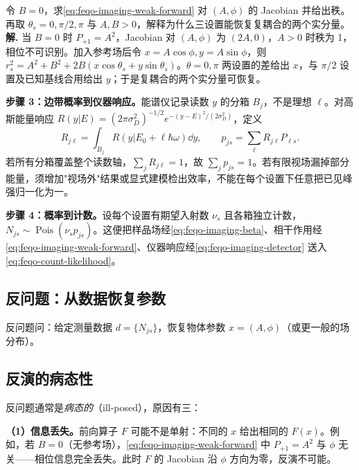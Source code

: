\par
\begin{workedexample}
令 \(B=0\)，求\cref{eq:feqo-imaging-weak-forward} 对 \((A,\phi)\) 的 Jacobian 并给出秩。再取 \(\theta_s=0,\pi/2,\pi\) 与 \(A,B>0\)，解释为什么三设置能恢复复耦合的两个实分量。
\textbf{解.} 当 \(B=0\) 时 \(P_{+1}=A^2\)，Jacobian 对 \((A,\phi)\) 为 \((2A,0)\)，\(A>0\) 时秩为 1，相位不可识别。加入参考场后令 \(x=A\cos\phi,y=A\sin\phi\)，则 \(r_s^2=A^2+B^2+2B(x\cos\theta_s+y\sin\theta_s)\)。\(\theta=0,\pi\) 两设置的差给出 \(x\)，与 \(\pi/2\) 设置及已知基线合用给出 \(y\)；于是复耦合的两个实分量可恢复。
\end{workedexample}
\par
\textbf{步骤 3：边带概率到仪器响应。}能谱仪记录读数 \(y\) 的分箱 \(B_j\)，不是理想 \(\ell\)。对高斯能量响应 \(R(y|E)=(2\pi\sigma_D^2)^{-1/2}e^{-(y-E)^2/(2\sigma_D^2)}\)，定义
\begin{equation}
R_{j\ell}=\int_{B_j}R(y|E_0+\ell\hbar\omega)\dd y,
\qquad p_{js}=\sum_\ell R_{j\ell}P_{\ell s}.
\label{eq:feqo-imaging-detector}
\end{equation}
若所有分箱覆盖整个读数轴，\(\sum_jR_{j\ell}=1\)，故 \(\sum_jp_{js}=1\)。若有限视场漏掉部分能量，须增加"视场外"结果或显式建模检出效率，不能在每个设置下任意把已见峰强归一化为一。

\textbf{步骤 4：概率到计数。}设每个设置有期望入射数 \(\nu_s\) 且各箱独立计数，\(N_{js}\sim\operatorname{Pois}(\nu_sp_{js})\)。这便把样品场经\cref{eq:feqo-imaging-beta}、相干作用经\cref{eq:feqo-imaging-weak-forward}、仪器响应经\cref{eq:feqo-imaging-detector} 送入\cref{eq:feqo-count-likelihood}。

\subsection{反问题：从数据恢复参数}

反问题问：给定测量数据 \(d=\{N_{js}\}\)，恢复物体参数 \(x=(A,\phi)\)（或更一般的场分布）。

\subsection{反演的病态性}

反问题通常是\emph{病态的}（ill-posed），原因有三：

\textbf{（1）信息丢失。}前向算子 \(F\) 可能不是单射：不同的 \(x\) 给出相同的 \(F(x)\)。例如，若 \(B=0\)（无参考场），\cref{eq:feqo-imaging-weak-forward} 中 \(P_{+1}=A^2\) 与 \(\phi\) 无关——相位信息完全丢失。此时 \(F\) 的 Jacobian 沿 \(\phi\) 方向为零，反演不可能。

